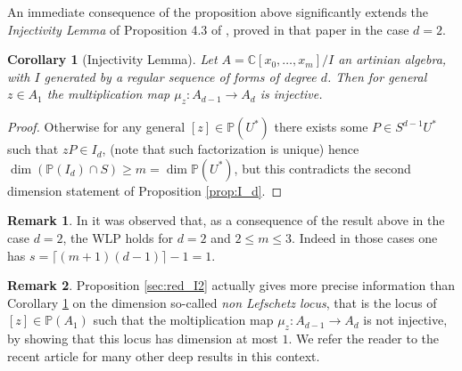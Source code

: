 \documentclass[10pt, a4paper]{amsart}
\theoremstyle{plain}
\newtheorem{cor}[prop]{Corollary}
\theoremstyle{definition}
\newtheorem{rmk}{Remark}
\theoremstyle{remark}
\def\C{\mathbb{C}}
\def\PP{\mathbb{P}}
\begin{document}
An immediate consequence of the proposition above significantly extends the {\em Injectivity Lemma} of Proposition 4.3 of \cite{MN}, proved in that paper in the case $d=2$.
\begin{cor}[Injectivity Lemma]\label{cor:injlemma} Let $A=\C[x_0,\ldots,x_m]/I$ an artinian algebra, with $I$ generated by a regular sequence of forms of degree $d$. Then for general $z\in A_1$ the multiplication map $\mu_z:A_{d-1}\longrightarrow A_d$ is injective. 
\end{cor}
\begin{proof} Otherwise for any general $[z]\in\PP(U^\ast)$ there exists some $P\in S^{d-1}U^\ast$ such that $zP\in I_d$, (note that such factorization is unique) hence $\dim(\PP(I_d)\cap S)\geq m=\dim\PP(U^\ast)$, but this contradicts the second dimension statement of Proposition \ref{prop:I_d}. \end{proof}


\begin{rmk}\label{rmk:d2m3} In \cite{MN} it was observed that, as a consequence of the result above in the case $d=2$, the WLP holds for $d=2$ and $2\leq m\leq 3$. Indeed in those cases one has $s=\lceil(m+1)(d-1)\rceil-1=1$.
\end{rmk}

\begin{rmk} Proposition \ref{sec:red_I2} actually gives more precise information than Corollary \ref{cor:injlemma} on the dimension so-called {\em non Lefschetz locus}, that is the locus of $[z]\in \PP(A_1)$ such that the moltiplication map $\mu_z:A_{d-1}\to A_d$ is not injective, by showing that this locus has dimension at most $1$. We refer the reader to the recent article \cite{BoMiRoNa} for many other deep results in this context.
\end{rmk}
\end{document}
